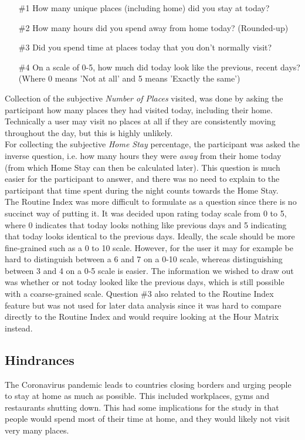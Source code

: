 \begin{itemize}
    \item[\#1] How many unique places (including home) did you stay at today?
    \item[\#2] How many hours did you spend away from home today? (Rounded-up)
    \item[\#3] Did you spend time at places today that you don't normally visit?
    \item[\#4] On a scale of 0-5, how much did today look like the previous, recent days? (Where 0 means 'Not at all' and 5 means 'Exactly the same')
\end{itemize}

Collection of the subjective \textit{Number of Places} visited, was done by asking the participant how many places they had visited today, including their home. Technically a user may visit no places at all if they are consistently moving throughout the day, but this is highly unlikely.\\

For collecting the subjective \textit{Home Stay} percentage, the participant was asked the inverse question, i.e. how many hours they were \textit{away} from their home today (from which Home Stay can then be calculated later). This question is much easier for the participant to answer, and there was no need to explain to the participant that time spent during the night counts towards the Home Stay. \\

The Routine Index was more difficult to formulate as a question since there is no succinct way of putting it. It was decided upon rating today scale from 0 to 5, where 0 indicates that today looks nothing like previous days and 5 indicating that today looks identical to the previous days. Ideally, the scale should be more fine-grained such as a 0 to 10 scale. However, for the user it may for example be hard to distinguish between a 6 and 7 on a 0-10 scale, whereas distinguishing between 3 and 4 on a 0-5 scale is easier. The information we wished to draw out was whether or not today looked like the previous days, which is still possible with a coarse-grained scale. Question \#3 also related to the Routine Index feature but was not used for later data analysis since it was hard to compare directly to the Routine Index and would require looking at the Hour Matrix instead.

\subsection{Hindrances}
The Coronavirus pandemic leads to countries closing borders and urging people to stay at home as much as possible. This included workplaces, gyms and restaurants shutting down. This had some implications for the study in that people would spend most of their time at home, and they would likely not visit very many places.\\

